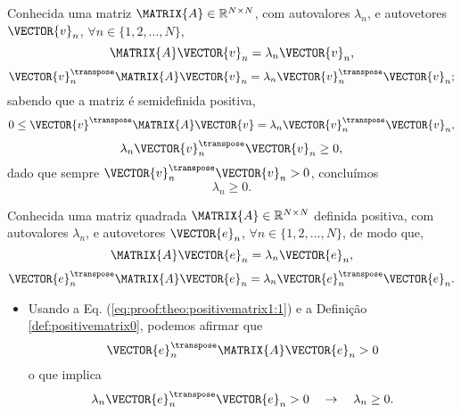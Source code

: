 \begin{myproofT}\label{proof:theo:semipositivematrix2}
Conhecida uma matriz $\MATRIX{A} \in \mathbb{R}^{N \times N}$, com  autovalores $\lambda_n$,
e autovetores $\VECTOR{v}_n$, $\forall n \in \{1, 2, ..., N\}$,
\begin{equation}
\MATRIX{A}\VECTOR{v}_n = \lambda_n \VECTOR{v}_n, 
\end{equation}
\begin{equation}
\VECTOR{v}_n^{\transpose}\MATRIX{A}\VECTOR{v}_n = \lambda_n \VECTOR{v}_n^{\transpose}\VECTOR{v}_n;
\end{equation}
sabendo que a matriz é semidefinida positiva,
\begin{equation}
0 \leq \VECTOR{v}^{\transpose}\MATRIX{A}\VECTOR{v} = \lambda_n \VECTOR{v}_n^{\transpose}\VECTOR{v}_n,
\end{equation}
\begin{equation}
\lambda_n \VECTOR{v}_n^{\transpose}\VECTOR{v}_n \geq 0,
\end{equation}
dado que sempre $\VECTOR{v}_n^{\transpose}\VECTOR{v}_n> 0$, concluímos
\begin{equation}
\lambda_n  \geq 0.
\end{equation} 
\end{myproofT}

\begin{myproofT}\label{proof:theo:positivematrix1}
Conhecida uma matriz quadrada $\MATRIX{A} \in \mathbb{R}^{N \times N}$ definida positiva, com  autovalores $\lambda_n$,
e autovetores $\VECTOR{e}_n$, $\forall n \in \{1, 2, ..., N\}$, de modo que,
\begin{equation}\label{eq:proof:theo:positivematrix1:0}
\MATRIX{A}\VECTOR{e}_n=\lambda_n \VECTOR{e}_n,
\end{equation}
\begin{equation}\label{eq:proof:theo:positivematrix1:1}
\VECTOR{e}_n^{\transpose}\MATRIX{A}\VECTOR{e}_n=\lambda_n \VECTOR{e}_n^{\transpose}\VECTOR{e}_n.
\end{equation}

\begin{itemize}
\item Usando a Eq. (\ref{eq:proof:theo:positivematrix1:1}) e a 
Definição \ref{def:positivematrix0}, podemos afirmar que
\begin{equation}
\VECTOR{e}_n^{\transpose}\MATRIX{A}\VECTOR{e}_n >0
\end{equation} 
o que implica
\begin{equation}
\lambda_n \VECTOR{e}_n^{\transpose}\VECTOR{e}_n > 0
\quad \rightarrow \quad
\lambda_n  \geq 0.
\end{equation} 
\end{itemize}
\end{myproofT}



